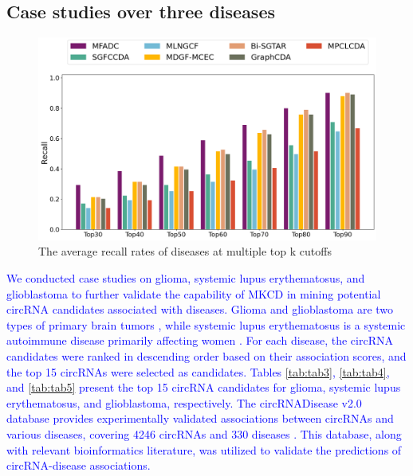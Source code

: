 \documentclass{bioinfo}
\begin{document}
\begin{methods}
\subsection{Case studies over three diseases}

\begin{figure}[!t]
    \centering
    \includegraphics[width=6.5in]{fig/TopK_Recall.png}
     \caption{The average recall rates of diseases at multiple top k cutoffs}
    \label{fig:topK}
\end{figure}

\textcolor{blue}{We conducted case studies on glioma, systemic lupus erythematosus, and glioblastoma to further validate the capability of MKCD in mining potential circRNA candidates associated with diseases. Glioma and glioblastoma are two types of primary brain tumors \cite{weller2015glioma, wirsching2017glioblastoma}, while systemic lupus erythematosus is a systemic autoimmune disease primarily affecting women \cite{borchers2010geoepidemiology}. For each disease, the circRNA candidates were ranked in descending order based on their association scores, and the top 15 circRNAs were selected as candidates. Tables \ref{tab:tab3}, \ref{tab:tab4}, and \ref{tab:tab5} present the top 15 circRNA candidates for glioma, systemic lupus erythematosus, and glioblastoma, respectively. \textcolor{blue}{The circRNADisease v2.0 database provides experimentally validated associations between circRNAs and various diseases, covering 4246 circRNAs and 330 diseases \cite{sun2024mode}. This database, along with relevant bioinformatics literature, was utilized to validate the predictions of circRNA-disease associations.}}


\end{methods}
\end{document}

